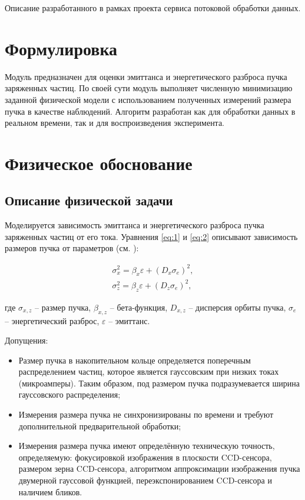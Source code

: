 \documentclass[../thesis.tex]{subfiles}
\begin{document}
	\setcounter{section}{0}

	Описание разработанного в рамках проекта сервиса потоковой обработки данных.

	\section{Формулировка}

	Модуль предназначен для оценки эмиттанса и энергетического разброса пучка заряженных частиц. По
	своей сути модуль выполняет численную минимизацию заданной физической модели с использованием
	полученных измерений размера пучка в качестве наблюдений. Алгоритм разработан как для обработки данных
	в реальном времени, так и для воспроизведения эксперимента.

	\section{Физическое обоснование}

	\subsection{Описание физической задачи}

	Моделируется зависимость эмиттанса и энергетического разброса пучка заряженных частиц от его
	тока. Уравнения \ref{eq:1} и \ref{eq:2} описывают зависимость размеров пучка от параметров (см. \cite{binp}):

	\begin{align}
		\label{eq:1}\sigma_{x}^{2}= \beta_{x}\varepsilon + (D_{x}\sigma_{e})^{2}, \\
		\label{eq:2}\sigma_{z}^{2}= \beta_{z}\varepsilon + (D_{z}\sigma_{e})^{2},
	\end{align}

	\noindent
	где $\sigma_{x, z}$ -- размер пучка, $\beta_{x, z}$ -- бета-функция, $D_{x, z}$ -- дисперсия
	орбиты пучка, $\sigma_{e}$ -- энергетический разброс, $\varepsilon$ -- эмиттанс.

	\noindent
	Допущения:

	\begin{itemize}
		\item Размер пучка в накопительном кольце определяется поперечным распределением частиц,
			которое является гауссовским при низких токах (микроамперы). Таким образом, под размером
			пучка подразумевается ширина гауссовского распределения;

		\item Измерения размера пучка не синхронизированы по времени и требуют дополнительной предварительной
			обработки;

		\item Измерения размера пучка имеют определённую техническую точность, определяемую: фокусировкой
			изображения в плоскости CCD-сенсора, размером зерна CCD-сенсора, алгоритмом аппроксимации
			изображения пучка двумерной гауссовой функцией, переэкспонированием CCD-сенсора и
			наличием бликов.
	\end{itemize}
\end{document}
